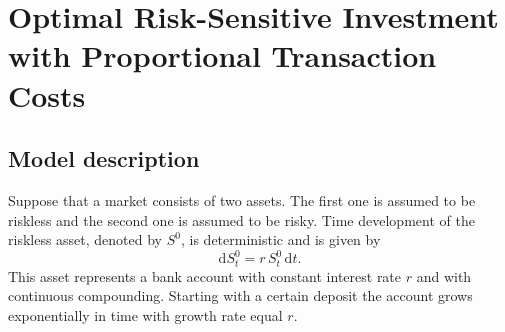 \chapter{Optimal Risk-Sensitive Investment with Proportional Transaction Costs}

\section{Model description} 
Suppose that a market consists of two assets. The first one is assumed to be riskless and the second one is assumed to be risky. Time development of the riskless asset, denoted by $S^0$, is deterministic and is given by
\begin{equation}
\mathrm{d}S^0_t=r\,S^0_t\,\mathrm{d}t.
\end{equation}
This asset represents a bank account with constant interest rate $r$ and with continuous compounding. Starting with a certain deposit the account grows exponentially in time with growth rate equal $r$.

